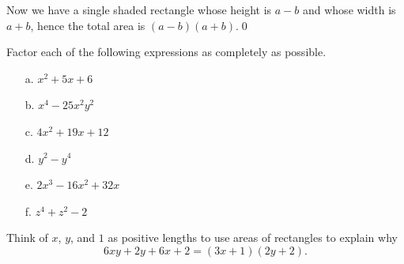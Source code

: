 \begin{eg}
Now we have a single shaded rectangle whose height is $a-b$ and whose width is $a+b$, hence the total area is $(a-b)(a+b)$.\qed

\end{eg}

\begin{question} Factor each of the following expressions as completely as possible.
\begin{enumerate}
\item[a.] $x^2+5x+6$
\item[b.] $x^4-25x^2y^2$
\item[c.] $4x^2+19x+12$
\item[d.] $y^2-y^4$
\item[e.] $2x^3-16x^2+32x$
\item[f.] $z^4+z^2-2$
\end{enumerate}
\end{question}

\begin{question} Think of $x$, $y$, and $1$ as positive lengths to use areas of rectangles to explain why
\[
6xy + 2y+6x+2 = (3x+1)(2y+2).
\]
\end{question}
 